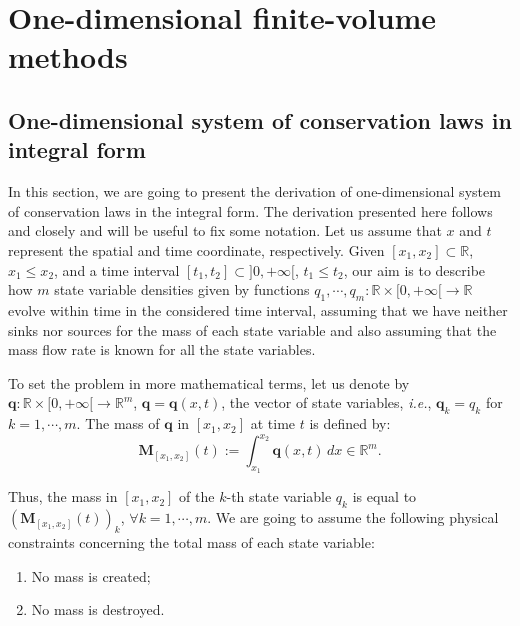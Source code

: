 
\chapter{One-dimensional finite-volume methods}
\label{chp1-1d-fv}
\section{One-dimensional system of conservation laws in integral form}
\label{chp1-sec1}
In this section, we are going to present the derivation of one-dimensional 
system of conservation laws in the integral form. 
The derivation presented here follows \citet{leveque:1990} and \citet{leveque:2002} closely and will
be useful to fix some notation. 
Let us assume that $x$ and $t$ represent the spatial and time coordinate, respectively.
Given $[x_1, x_2] \subset \mathbb{R}$, $x_1 \leq x_2$, and a time 
interval $[t_1, t_2] \subset ]0, +\infty[$, $t_1 \leq t_2$, 
our aim is to describe how $m$ state variable densities given by functions 
$q_1, \cdots, q_m: \mathbb{R}\times[0, +\infty[ \to \mathbb{R}$ 
evolve within time in the considered time interval, assuming that we have neither sinks nor sources 
for the mass of each state variable and also assuming that the mass
flow rate is known for all the state variables.

To set the problem in more mathematical terms, let us denote by 
$\mathbf{q}: \mathbb{R}\times [0, +\infty[\to \mathbb{R}^m$, 
$\mathbf{q} = \mathbf{q}(x,t)$, the vector of state variables,
\textit{i.e.}, $\mathbf{q}_k = q_k$ for $k=1, \cdots, m$.
The mass of $\mathbf{q}$ in $[x_1, x_2]$ at time $t$ is defined by:
\begin{equation}
	\label{chp1-sec1-eq1}
	\mathbf{M}_{[x_1, x_2]}(t) := \int_{x_1}^{x_2} \mathbf{q}(x,t) \,dx \in \mathbb{R}^m.
\end{equation}

Thus, the mass in $[x_1, x_2]$ of the $k$-th state variable $q_k$ is equal to
$(\mathbf{M}_{[x_1, x_2]}(t))_k$, $\forall k = 1, \cdots, m$.
We are going to assume the following physical constraints concerning the total mass of each state variable:
\begin{enumerate}
	\item No mass is created;
	\item No mass is destroyed.
\end{enumerate}

